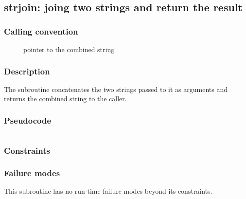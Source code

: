 \clearpage
{}
{}
\label{subr:strjoin}
\subsection*{strjoin: joing two strings and return the result}

\subsubsection*{Calling convention}

\begin{description}
\item[] pointer to the combined string
\end{description}

\subsubsection*{Description}

The  subroutine concatenates the two strings
passed to it as arguments and returns the combined string to the
caller.

\subsubsection*{Pseudocode}

\begin{verbatim}
\end{verbatim}

\subsubsection*{Constraints}

\subsubsection*{Failure modes}

This subroutine has no run-time failure modes beyond its constraints.
